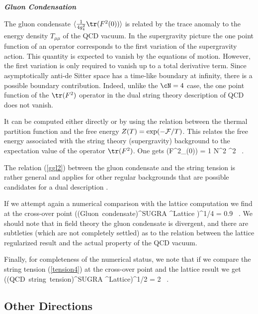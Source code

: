 \medskip

{\it\bf Gluon Condensation}

The gluon condensate $\langle {1 \over 4 g_{4}^2}\tr(F^2(0)) \rangle$
is related by the trace anomaly to the energy density $T_{\mu\mu}$ of
the QCD vacuum.  In the supergravity picture the one point function of
an operator corresponds to the first variation of the supergravity
action. This quantity is expected to vanish by the equations of
motion. However, the first variation is only required to vanish up to
a total derivative term. Since asymptotically anti-de Sitter space has
a time-like boundary at infinity, there is a possible boundary
contribution. Indeed, unlike the $\cN=4$ case, the one point function
of the $\tr(F^2)$ operator in the dual string theory description of
QCD does not vanish.

It can be computed either directly or by using the relation between
the thermal partition function and the free energy $Z(T)=\exp(-{\cal
F}/T)$. This relates the free energy associated with the string theory
(supergravity) background to the expectation value of the operator
$\tr(F^2) $.  One gets \cite{Hashimoto:1998ao}
\beq
{}\tr(F^2_{\mu\nu}(0)) \rangle =
{1\pi } {N^2\over\lambda} \sigma^2  \ .
\label{ggl2}
\eeq

The relation (\ref{ggl2}) between the gluon condensate and the string
tension is rather general and applies for other regular backgrounds
that are possible candidates for a dual description
\cite{Csaki:1999ln}. 

If we attempt again a numerical comparison with the lattice computation 
\cite{Campostrini:1989gc,DElia1997fs} we find at the
cross-over point
\beq
\left({{({\rm Gluon\ condensate})}^{{\rm SUGRA}}  
^{{\rm Lattice}}}
\right)^{1/4}  =  0.9 \ .
\eeq
We should note that in field theory the gluon condensate is divergent, 
and there are subtleties (which are not
completely settled) as to the relation between the lattice regularized result
and the actual property of the QCD vacuum.


Finally, for completeness of the numerical status,
we note that if we compare the string tension (\ref{tension4}) 
at the cross-over point and the lattice result 
we get 
\beq
\left({{({\rm QCD\ string\ tension})}^{{\rm SUGRA}}  
^{{\rm Lattice}}}\right)^{1/2}  = 2 \ .
\eeq
\subsection{Other Directions}

